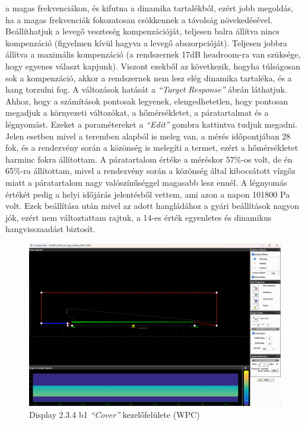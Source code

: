 a magas frekvenciákon, és kifutna a dinamika tartalékból, ezért jobb megoldás, ha a magas frekvenciák fokozatosan csökkennek a távolság növekedésével.
Beállíthatjuk a levegő veszteség kompenzációját, teljesen balra állítva nincs kompenzáció (figyelmen kívül hagyva a levegő abszorpcióját).
Teljesen jobbra állítva a maximális kompenzáció (a rendszernek 17dB headroom-ra van szüksége, hogy egyenes választ kapjunk).
Viszont ezekből az következik, hogyha túlságosan sok a kompenzáció, akkor a rendszernek nem lesz elég dinamika tartaléka, és a hang torzulni fog.
A változások hatását a \textit{``Target Response''} ábrán láthatjuk.
Ahhoz, hogy a számítások pontosak legyenek, elengedhetetlen, hogy pontosan megadjuk a környezeti változókat,
a hőmérsékletet, a páratartalmat és a légnyomást. Ezeket a paramétereket a \textit{``Edit''} gombra kattintva tudjuk megadni.
Jelen esetben mivel a teremben alapból is meleg van, a mérés időpontjában 28 fok, és a rendezvény során a közönség is melegíti a termet,
ezért a hőmérsékletet harminc fokra állítottam.
A páratartalom értéke a méréskor 57\%-os volt, de én 65\%-ra állítottam, mivel a rendezvény során a közönség által kibocsátott
vízgőz miatt a páratartalom nagy valószínűséggel magasabb lesz ennél. A légnyomás értékét pedig a helyi időjárás jelentésből vettem, ami
azon a napon 101800 Pa volt. Ezek beállítása után mivel az adott hangládához a gyári beállítások nagyon jók, ezért nem változtattam rajtuk,
a 14-es érték egyenletes és dinamikus hangvisszaadást biztosít.
\begin{figure}[H]
	\centering
	\includegraphics[width=\textwidth, keepaspectratio]{figures/display_wpc_2.png}
	\caption{Display 2.3.4 b1 \textit{``Cover''} kezelőfelülete (WPC)}\label{fig:display_wpc_2}
\end{figure}
